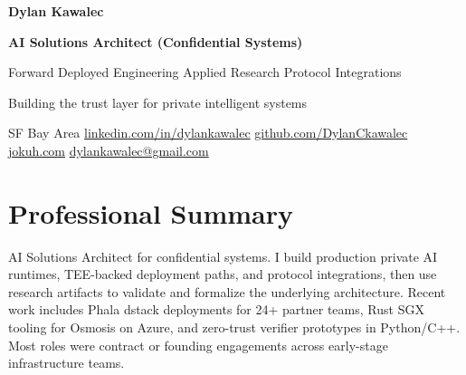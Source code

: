\documentclass[10pt]{article}
\let\resumeoldtextbf\textbf
\renewcommand{\textbf}[1]{\textcolor{HighlightGray}{\resumeoldtextbf{#1}}}
\newcommand{\link}[2]{\href{#1}{\textcolor{TitleBlue}{#2}}}
\begin{document}
{\LARGE \resumeoldtextbf{Dylan Kawalec}}\par
{\normalsize \textcolor{HighlightGray}{\textbf{AI Solutions Architect (Confidential Systems)}}}\par
{\small \textcolor{HighlightGray}{Forward Deployed Engineering \textbar{} Applied Research \textbar{} Protocol Integrations}}\par
{\small \textcolor{HighlightGray}{Building the trust layer for private intelligent systems}}\par
\vspace{1pt}
{\small
\textcolor{HighlightGray}{SF Bay Area}
\hspace{0.35em}\textbar{}\hspace{0.35em}
\link{https://linkedin.com/in/dylankawalec}{linkedin.com/in/dylankawalec}
\hspace{0.35em}\textbar{}\hspace{0.35em}
\link{https://github.com/DylanCkawalec}{github.com/DylanCkawalec}
\hspace{0.35em}\textbar{}\hspace{0.35em}
\link{https://jokuh.com}{jokuh.com}
\hspace{0.35em}\textbar{}\hspace{0.35em}
\link{mailto:dylankawalec@gmail.com}{dylankawalec@gmail.com}
}\par

\section*{Professional Summary}
\small
AI Solutions Architect for confidential systems. I build production private AI runtimes, TEE-backed deployment paths, and protocol integrations, then use research artifacts to validate and formalize the underlying architecture. Recent work includes Phala dstack deployments for 24+ partner teams, Rust SGX tooling for Osmosis on Azure, and zero-trust verifier prototypes in Python/C++. Most roles were contract or founding engagements across early-stage infrastructure teams.

\end{document}
